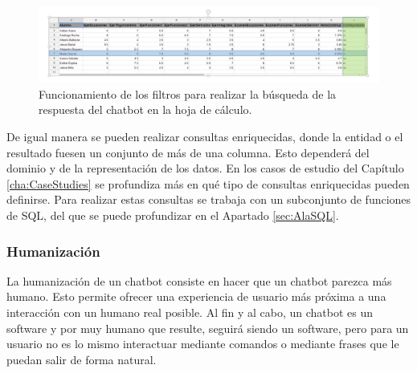 \begin{figure}[htb]
	\centering
	\includegraphics[width=1.1\textwidth]{./figs/SheetFilter.png}
	\caption{Funcionamiento de los filtros para realizar la búsqueda de la respuesta del chatbot en la hoja de cálculo.}
	\label{fig:SheetFilter}
\end{figure}

De igual manera se pueden realizar consultas enriquecidas, donde la entidad o el resultado fuesen un conjunto de más de una columna. Esto dependerá del dominio y de la representación de los datos. En los casos de estudio del Capítulo \ref{cha:CaseStudies} se profundiza más en qué tipo de consultas enriquecidas pueden definirse. Para realizar estas consultas se trabaja con un subconjunto de funciones de SQL, del que se puede profundizar en el Apartado \ref{sec:AlaSQL}. 

\subsubsection{Humanización}
\label{sec:Humanization}

La humanización de un chatbot consiste en hacer que un chatbot parezca más humano. Esto permite ofrecer una experiencia de usuario más próxima a una interacción con un humano real posible. Al fin y al cabo, un chatbot es un software y por muy humano que resulte, seguirá siendo un software, pero para un usuario no es lo mismo interactuar mediante comandos o mediante frases que le puedan salir de forma natural.

